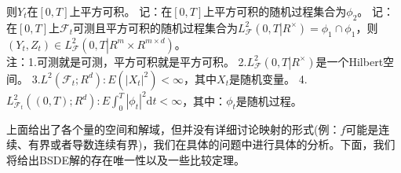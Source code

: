 			则$Y_t$在$[0,T]$上平方可积。
			记：在$[0,T]$上平方可积的随机过程集合为${\phi}_2 $。
			记：在$[0,T]$上${{\mathcal {F}}_t}$可测且平方可积的随机过程集合为$L_{\mathcal{F}} ^2\left( {0,T\left| R^\times \right.} \right) = {\phi _1} \cap {\phi _1} $，则$\left( {{Y_t},{Z_t}} \right) \in L_{\mathcal{F}} ^2\left( {0,T\left| {{R^m} \times {R^{m \times d}}} \right.} \right)$。\\
			注：1.可测就是可测，平方可积就是平方可积。
			2.$L_{\mathcal{F}} ^2\left( {0,T\left| R^\times \right.} \right)$是一个Hilbert空间。
			3.${L^2}\left( {{\mathcal{F}_t};{R^d}} \right) : E\left( | X_t |^2 \right)< \infty$，其中$X_t$是随机变量。
			4.$L_{{\mathcal{F}}_t}^2((0,T);R^d):E\int_0^T|\phi_t|^2\mathrm{d}t < \infty$，其中：$\phi_t$是随机过程。
			\par
			上面给出了各个量的空间和解域，但并没有详细讨论映射的形式(例：$f$可能是连续、有界或者导数连续有界)，我们在具体的问题中进行具体的分析。下面，我们将给出BSDE解的存在唯一性以及一些比较定理。

